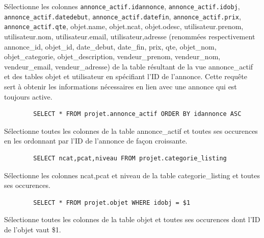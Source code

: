 \documentclass[a4paper,12pt]{article}
\begin{document}
\begin{spacing}{1}
\begin{verbatim}
	\end{verbatim}
Sélectionne les colonnes \texttt{annonce\_actif.idannonce}, \texttt{annonce\_actif.idobj}, \texttt{annonce\_actif.datedebut}, \texttt{annonce\_actif.datefin}, \texttt{annonce\_actif.prix}, \texttt{annonce\_actif.qte}, objet.name, objet.ncat, objet.odesc, utilisateur.prenom, utilisateur.nom, utilisateur.email, utilisateur,adresse (renommées respectivement annonce\_id, objet\_id, date\_debut, date\_fin, prix, qte, objet\_nom, objet\_categorie, objet\_description, vendeur\_prenom, vendeur\_nom, vendeur\_email, vendeur\_adresse) de la table résultant de la vue annonce\_actif et des tables objet et utilisateur en spécifiant l'ID de l'annonce.
Cette requête sert à obtenir les informations nécessaires en lien avec une annonce qui est toujours active.

    \begin{verbatim}
        SELECT * FROM projet.annonce_actif ORDER BY idannonce ASC        
    \end{verbatim}
Sélectionne toutes les colonnes de la table annonce\_actif et toutes ses occurences en les ordonnant par l'ID de l'annonce de façon croissante.

    \begin{verbatim}
        SELECT ncat,pcat,niveau FROM projet.categorie_listing
    \end{verbatim}
Sélectionne les colonnes ncat,pcat et niveau de la table categorie\_listing et toutes ses occurences.

    \begin{verbatim}
        SELECT * FROM projet.objet WHERE idobj = $1
    \end{verbatim}
Sélectionne toutes les colonnes de la table objet et toutes ses occurences dont l'ID de l'objet vaut \$1.


\end{spacing}
\end{document}

